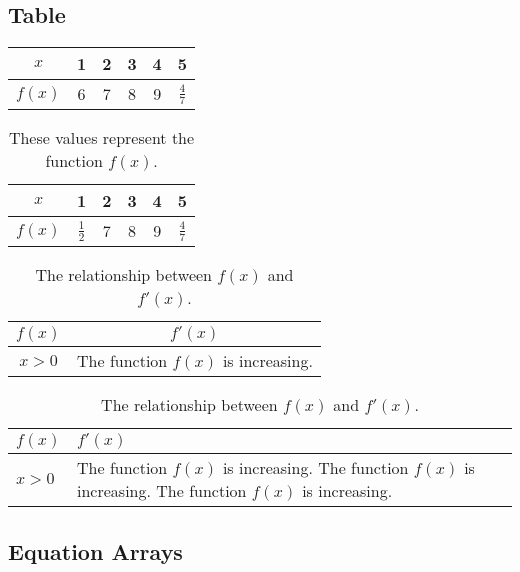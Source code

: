 \documentclass[12pt]{article}
\begin{document}
	\subsection{Table}
	
	\leavevmode
	
	\begin{tabular}{|c||c|c|c|c|c|}
		\hline
		$x$ & 1 & 2 & 3 & 4 & 5 \\ \hline
		$f(x)$ & 6 & 7 & 8 & 9 & $\frac{4}{7}$ \\ \hline
	\end{tabular}
	\vspace{1cm}
	
	\begin{table}[H]
		\centering
		\def\arraystretch{1.5}
		\begin{tabular}{|c||c|c|c|c|c|}
			\hline
			$x$ & 1 & 2 & 3 & 4 & 5\\ \hline
			$f(x)$ & $\frac{1}{2}$ & 7 & 8 & 9 & $\frac{4}{7}$\\ \hline
		\end{tabular}
	\caption{These values represent the function $f(x)$.}
	\end{table}
	
	\begin{table}[H]
		\centering
		\def\arraystretch{1.5}
		\begin{tabular}{|c|c|}
			\hline
			$f(x)$ & $f'(x)$ \\ \hline
			$x>0$ & The function $f(x)$ is increasing.\\ \hline
		\end{tabular}
		\caption{The relationship between $f(x)$ and $f'(x)$.}
	\end{table}
	
	\begin{table}[H]
		\centering
		\def\arraystretch{1.5}
		\begin{tabular}{|l|p{3in}|}
			\hline
			$f(x)$ & $f'(x)$ \\ \hline
			$x>0$ & The function $f(x)$ is increasing. The function $f(x)$ is increasing. The function $f(x)$ is increasing.\\ \hline
		\end{tabular}
		\caption{The relationship between $f(x)$ and $f'(x)$.}
	\end{table}
	
	\subsection{Equation Arrays}
	
\end{document}

